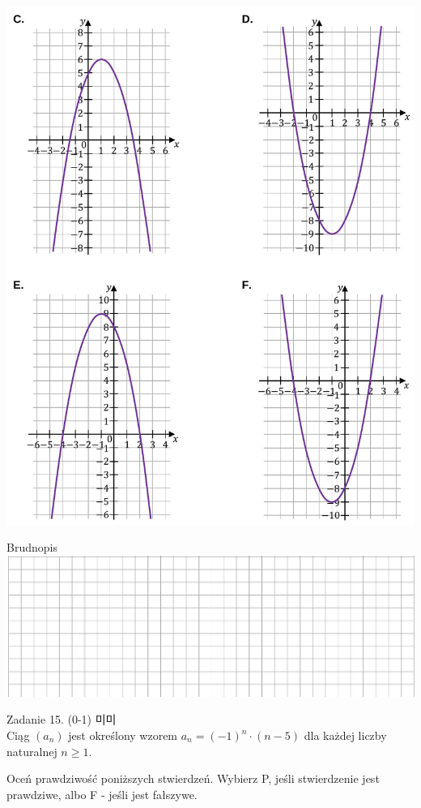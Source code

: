 \documentclass[10pt]{article}
\begin{document}
\includegraphics[max width=\textwidth, center]{2024_11_21_daeb5e5efb43dd4cb535g-15(1)}

Brudnopis\\
\includegraphics[max width=\textwidth, center]{2024_11_21_daeb5e5efb43dd4cb535g-15}

Zadanie 15. (0-1) 미미\\
Ciąg \(\left(a_{n}\right)\) jest określony wzorem \(a_{n}=(-1)^{n} \cdot(n-5)\) dla każdej liczby naturalnej \(n \geq 1\).

Oceń prawdziwość poniższych stwierdzeń. Wybierz P, jeśli stwierdzenie jest prawdziwe, albo F - jeśli jest fałszywe.
\end{document}
